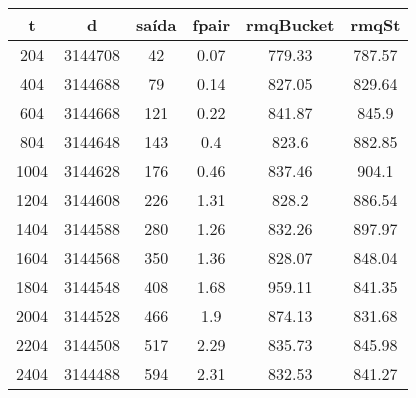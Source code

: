 \begin{tabular}{|c|c|c|c|c|c|}
\hline
\textbf{t} & \textbf{d} & \textbf{saída} & \textbf{fpair} & \textbf{rmqBucket} & \textbf{rmqSt}\\
\hline
204 & 3144708 & 42 & 0.07 & 779.33 & 787.57\\
\hline
404 & 3144688 & 79 & 0.14 & 827.05 & 829.64\\
\hline
604 & 3144668 & 121 & 0.22 & 841.87 & 845.9\\
\hline
804 & 3144648 & 143 & 0.4 & 823.6 & 882.85\\
\hline
1004 & 3144628 & 176 & 0.46 & 837.46 & 904.1\\
\hline
1204 & 3144608 & 226 & 1.31 & 828.2 & 886.54\\
\hline
1404 & 3144588 & 280 & 1.26 & 832.26 & 897.97\\
\hline
1604 & 3144568 & 350 & 1.36 & 828.07 & 848.04\\
\hline
1804 & 3144548 & 408 & 1.68 & 959.11 & 841.35\\
\hline
2004 & 3144528 & 466 & 1.9 & 874.13 & 831.68\\
\hline
2204 & 3144508 & 517 & 2.29 & 835.73 & 845.98\\
\hline
2404 & 3144488 & 594 & 2.31 & 832.53 & 841.27\\
\hline
\end{tabular}
